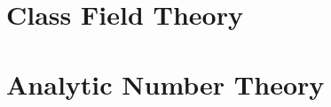 \part{Class Field Theory}

%






\part{Analytic Number Theory}




%
%
%
%
%
%

\appendix










\printindex

